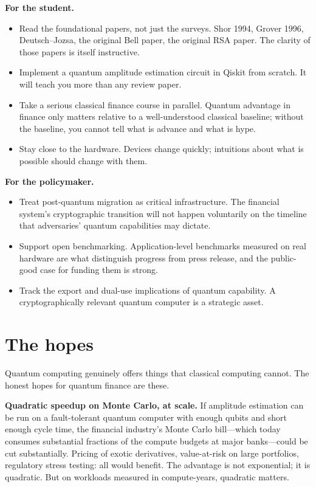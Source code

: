 \textbf{For the student.}
\begin{itemize}
  \item Read the foundational papers, not just the surveys. Shor 1994, Grover 1996, Deutsch--Jozsa, the original Bell paper, the original RSA paper. The clarity of those papers is itself instructive.
  \item Implement a quantum amplitude estimation circuit in Qiskit from scratch. It will teach you more than any review paper.
  \item Take a serious classical finance course in parallel. Quantum advantage in finance only matters relative to a well-understood classical baseline; without the baseline, you cannot tell what is advance and what is hype.
  \item Stay close to the hardware. Devices change quickly; intuitions about what is possible should change with them.
\end{itemize}

\textbf{For the policymaker.}
\begin{itemize}
  \item Treat post-quantum migration as critical infrastructure. The financial system's cryptographic transition will not happen voluntarily on the timeline that adversaries' quantum capabilities may dictate.
  \item Support open benchmarking. Application-level benchmarks measured on real hardware are what distinguish progress from press release, and the public-good case for funding them is strong.
  \item Track the export and dual-use implications of quantum capability. A cryptographically relevant quantum computer is a strategic asset.
\end{itemize}

\section{The hopes}

Quantum computing genuinely offers things that classical computing cannot. The honest hopes for quantum finance are these.

\textbf{Quadratic speedup on Monte Carlo, at scale.} If amplitude estimation can be run on a fault-tolerant quantum computer with enough qubits and short enough cycle time, the financial industry's Monte Carlo bill---which today consumes substantial fractions of the compute budgets at major banks---could be cut substantially. Pricing of exotic derivatives, value-at-risk on large portfolios, regulatory stress testing: all would benefit. The advantage is not exponential; it is quadratic. But on workloads measured in compute-years, quadratic matters.

